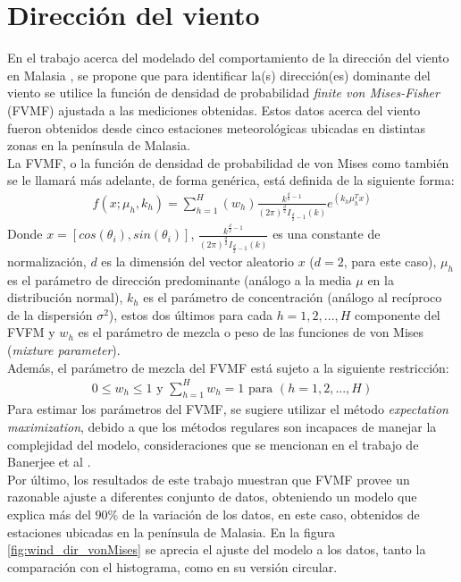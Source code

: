 \section{Dirección del viento}
En el trabajo acerca del modelado del comportamiento de la dirección del viento en Malasia \cite{Winddirelse15}, se propone que para identificar la(s) dirección(es) dominante del viento se utilice la función de densidad de probabilidad \emph{finite von Mises-Fisher} (FVMF) ajustada a las mediciones obtenidas. Estos datos acerca del viento fueron obtenidos desde cinco estaciones meteorológicas ubicadas en distintas zonas en la península de Malasia.\\
La FVMF, o la función de densidad de probabilidad de von Mises como también se le llamará más adelante, de forma genérica, está definida de la siguiente forma:
\begin{align}
    f(x;\mu_{h}, k_{h}) = \sum_{h=1}^{H}(w_{h})\frac{k^{\frac{d}{2} - 1}}{(2\pi)^{\frac{d}{2}}I_{\frac{d}{2} - 1} (k)}e^{(k_h\mu_{h}^{T}x)}
\end{align}    
Donde $x=[cos(\theta_i), sin(\theta_i)]$, $\frac{k^{\frac{d}{2} - 1}}{(2\pi)^{\frac{d}{2}}I_{\frac{d}{2} - 1} (k)}$ es una constante de normalización, $d$ es la dimensión del vector aleatorio $x$ ($d = 2$, para este caso), $\mu_{h}$ es el parámetro de dirección predominante (análogo a la media $\mu$ en la distribución normal), $k_h$ es el parámetro de concentración (análogo al recíproco de la dispersión $\sigma^{2}$), estos dos últimos para cada $h = 1, 2,...,H$ componente del FVFM y $w_h$ es el parámetro de mezcla o peso de las funciones de von Mises (\emph{mixture parameter}).\\
Además, el parámetro de mezcla del FVMF está sujeto a la siguiente restricción:
\begin{align}\label{eq:WeightConstraint}
    0 \leq w_h \leq 1 \text{ y } \sum_{h=1}^{H} w_{h} = 1 \text{ para } (h=1,2,...,H) 
\end{align}
Para estimar los parámetros del FVMF, se sugiere utilizar el método \emph{expectation maximization}, debido a que los métodos regulares son incapaces de manejar la complejidad del modelo, consideraciones que se mencionan en el trabajo de Banerjee et al \cite{Banerjee05}.\\
Por último, los resultados de este trabajo muestran que FVMF provee un razonable ajuste a diferentes conjunto de datos, obteniendo un modelo que explica más del $90\%$ de la variación de los datos, en este caso, obtenidos de estaciones ubicadas en la península de Malasia. En la figura \ref{fig:wind_dir_vonMises} se aprecia el ajuste del modelo a los datos, tanto la comparación con el histograma, como en su versión circular.\\
